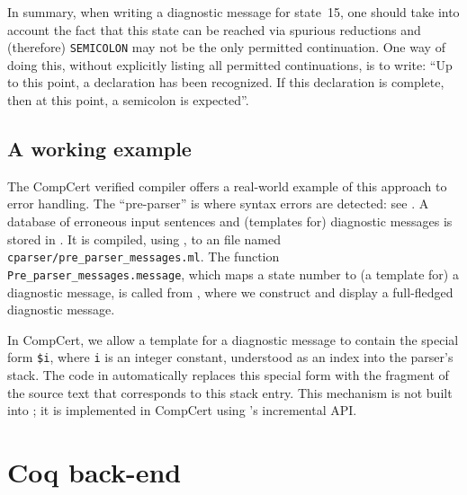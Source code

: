 \documentclass[onecolumn,11pt,nocopyrightspace,preprint]{sigplanconf}
\begin{document}
In summary, when writing a diagnostic message for state~15, one should take
into account the fact that this state can be reached via spurious reductions
and (therefore) \verb+SEMICOLON+ may not be the only permitted continuation.
One way of doing this, without explicitly listing all permitted continuations,
is to write: ``Up to this point, a declaration has been recognized. If this
declaration is complete, then at this point, a semicolon is expected''.


\subsection{A working example}
\label{sec:errors:example}

The CompCert verified compiler offers a real-world example of this approach to
error handling. The ``pre-parser'' is where syntax errors are detected: see
.
A database of erroneous input sentences and (templates for) diagnostic messages is stored in
. It is compiled, using \ocompileerrors,
to an \ocaml file named \texttt{cparser/pre\_parser\_messages.ml}. The
function \verb+Pre_parser_messages.message+, which maps a state number to (a template for) a
diagnostic message, is called from
,
where we construct and display a full-fledged diagnostic message.

In CompCert, we allow a template for a diagnostic message to contain the
special form \verb+$i+, where \verb+i+ is an integer constant, understood as
an index into the parser's stack. The code
in  automatically replaces this
special form with the fragment of the source text that corresponds to this
stack entry. This mechanism is not built into \menhir; it is implemented in
CompCert using \menhir's incremental API.


\section{Coq back-end}
\label{sec:coq}
\end{document}
